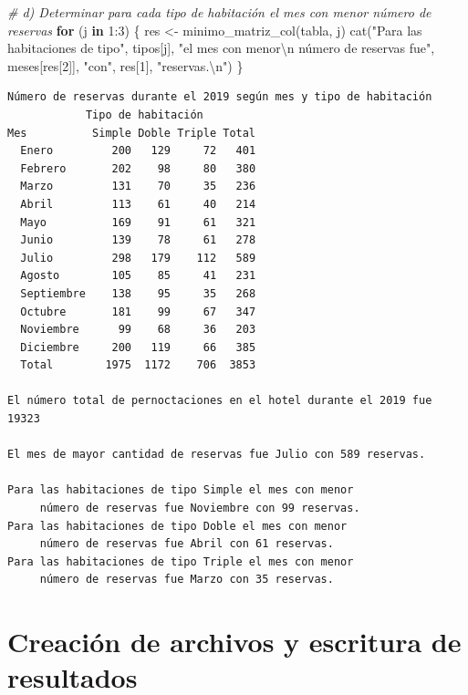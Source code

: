 \documentclass[
]{book}
\newenvironment{Shaded}{\begin{snugshade}}{\end{snugshade}}
\newcommand{\CommentTok}[1]{\textcolor[rgb]{0.56,0.35,0.01}{\textit{#1}}}
\newcommand{\ControlFlowTok}[1]{\textcolor[rgb]{0.13,0.29,0.53}{\textbf{#1}}}
\newcommand{\DecValTok}[1]{\textcolor[rgb]{0.00,0.00,0.81}{#1}}
\newcommand{\FunctionTok}[1]{\textcolor[rgb]{0.00,0.00,0.00}{#1}}
\newcommand{\NormalTok}[1]{#1}
\newcommand{\OtherTok}[1]{\textcolor[rgb]{0.56,0.35,0.01}{#1}}
\newcommand{\SpecialCharTok}[1]{\textcolor[rgb]{0.00,0.00,0.00}{#1}}
\newcommand{\StringTok}[1]{\textcolor[rgb]{0.31,0.60,0.02}{#1}}
\begin{document}
\begin{Shaded}
\begin{Highlighting}[]
\CommentTok{\# d) Determinar para cada tipo de habitación el mes con menor número de reservas}
\ControlFlowTok{for}\NormalTok{ (j }\ControlFlowTok{in} \DecValTok{1}\SpecialCharTok{:}\DecValTok{3}\NormalTok{) \{}
\NormalTok{    res }\OtherTok{\textless{}{-}} \FunctionTok{minimo\_matriz\_col}\NormalTok{(tabla, j)}
    \FunctionTok{cat}\NormalTok{(}\StringTok{"Para las habitaciones de tipo"}\NormalTok{, tipos[j], }
        \StringTok{"el mes con menor}\SpecialCharTok{\textbackslash{}n}\StringTok{     número de reservas fue"}\NormalTok{, }
\NormalTok{        meses[res[}\DecValTok{2}\NormalTok{]], }\StringTok{"con"}\NormalTok{, res[}\DecValTok{1}\NormalTok{], }\StringTok{"reservas.}\SpecialCharTok{\textbackslash{}n}\StringTok{"}\NormalTok{)}
\NormalTok{\}}
\end{Highlighting}
\end{Shaded}

\begin{verbatim}
Número de reservas durante el 2019 según mes y tipo de habitación
            Tipo de habitación
Mes          Simple Doble Triple Total
  Enero         200   129     72   401
  Febrero       202    98     80   380
  Marzo         131    70     35   236
  Abril         113    61     40   214
  Mayo          169    91     61   321
  Junio         139    78     61   278
  Julio         298   179    112   589
  Agosto        105    85     41   231
  Septiembre    138    95     35   268
  Octubre       181    99     67   347
  Noviembre      99    68     36   203
  Diciembre     200   119     66   385
  Total        1975  1172    706  3853

El número total de pernoctaciones en el hotel durante el 2019 fue 19323 

El mes de mayor cantidad de reservas fue Julio con 589 reservas.

Para las habitaciones de tipo Simple el mes con menor
     número de reservas fue Noviembre con 99 reservas.
Para las habitaciones de tipo Doble el mes con menor
     número de reservas fue Abril con 61 reservas.
Para las habitaciones de tipo Triple el mes con menor
     número de reservas fue Marzo con 35 reservas.
\end{verbatim}

\hypertarget{creaciuxf3n-de-archivos-y-escritura-de-resultados}{%
\section{Creación de archivos y escritura de resultados}\label{creaciuxf3n-de-archivos-y-escritura-de-resultados}}
\end{document}
